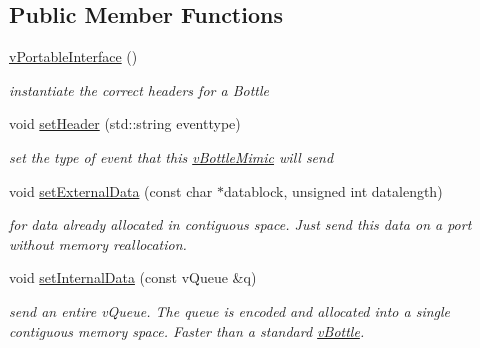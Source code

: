 \subsection*{Public Member Functions}
\begin{DoxyCompactItemize}
\item 
\mbox{\label{classev_1_1vPortableInterface_a4746190970eab382c61c2711c5b40636}} 
\hyperlink{classev_1_1vPortableInterface_a4746190970eab382c61c2711c5b40636}{v\+Portable\+Interface} ()
\begin{DoxyCompactList}\small\item\em instantiate the correct headers for a Bottle \end{DoxyCompactList}\item 
\mbox{\label{classev_1_1vPortableInterface_a4a8a2784b91e6f9e0e17ee1aee847f5d}} 
void \hyperlink{classev_1_1vPortableInterface_a4a8a2784b91e6f9e0e17ee1aee847f5d}{set\+Header} (std\+::string eventtype)
\begin{DoxyCompactList}\small\item\em set the type of event that this \hyperlink{classev_1_1vBottleMimic}{v\+Bottle\+Mimic} will send \end{DoxyCompactList}\item 
\mbox{\label{classev_1_1vPortableInterface_aa2a6980456b48a29e92d126de656276e}} 
void \hyperlink{classev_1_1vPortableInterface_aa2a6980456b48a29e92d126de656276e}{set\+External\+Data} (const char $\ast$datablock, unsigned int datalength)
\begin{DoxyCompactList}\small\item\em for data already allocated in contiguous space. Just send this data on a port without memory reallocation. \end{DoxyCompactList}\item 
\mbox{\label{classev_1_1vPortableInterface_ad2dd57b8ef653984b5a52522cfddaea9}} 
void \hyperlink{classev_1_1vPortableInterface_ad2dd57b8ef653984b5a52522cfddaea9}{set\+Internal\+Data} (const v\+Queue \&q)
\begin{DoxyCompactList}\small\item\em send an entire v\+Queue. The queue is encoded and allocated into a single contiguous memory space. Faster than a standard \hyperlink{classev_1_1vBottle}{v\+Bottle}. \end{DoxyCompactList}\item 

\end{DoxyCompactItemize}
